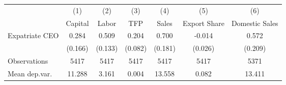 \begin{tabular}{l*{6}{c}}
\hline\hline
                    &\multicolumn{1}{c}{(1)}&\multicolumn{1}{c}{(2)}&\multicolumn{1}{c}{(3)}&\multicolumn{1}{c}{(4)}&\multicolumn{1}{c}{(5)}&\multicolumn{1}{c}{(6)}\\
                    &\multicolumn{1}{c}{Capital}&\multicolumn{1}{c}{Labor}&\multicolumn{1}{c}{TFP}&\multicolumn{1}{c}{Sales}&\multicolumn{1}{c}{Export Share}&\multicolumn{1}{c}{Domestic Sales}\\
\hline
Expatriate CEO      &       0.284&       0.509&       0.204&       0.700&      -0.014&       0.572\\
                    &     (0.166)&     (0.133)&     (0.082)&     (0.181)&     (0.026)&     (0.209)\\
\hline
Observations        &        5417&        5417&        5417&        5417&        5417&        5371\\
Mean dep.var.       &      11.288&       3.161&       0.004&      13.558&       0.082&      13.411\\
\hline\hline
\end{tabular}
